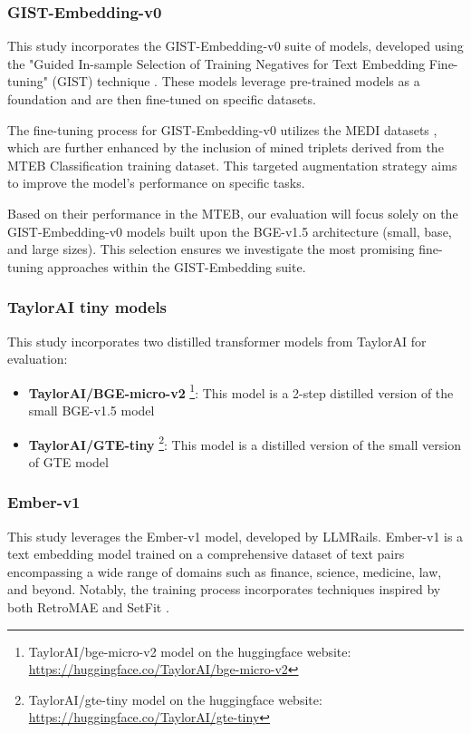 \subsubsection{GIST-Embedding-v0}
This study incorporates the GIST-Embedding-v0 suite of models, developed using the "Guided In-sample Selection of Training Negatives for Text Embedding Fine-tuning" (GIST) technique \cite{solatorio2024gistembed}.
These models leverage pre-trained models as a foundation and are then fine-tuned on specific datasets.

The fine-tuning process for GIST-Embedding-v0 utilizes the MEDI datasets \cite{su2023embedder}, which are further enhanced by the inclusion of mined triplets derived from the \ac{MTEB} Classification training dataset.
This targeted augmentation strategy aims to improve the model's performance on specific tasks.

Based on their performance in the \ac{MTEB}, our evaluation will focus solely on the GIST-Embedding-v0 models built upon the \ac{BGE}-v1.5 architecture (small, base, and large sizes).
This selection ensures we investigate the most promising fine-tuning approaches within the GIST-Embedding suite.

\subsubsection{TaylorAI tiny models} \label{model:taylorai}
This study incorporates two distilled transformer models from TaylorAI for evaluation:

\begin{itemize}
  \item \textbf{TaylorAI/BGE-micro-v2} \footnote{TaylorAI/bge-micro-v2 model on the huggingface website: \url{https://huggingface.co/TaylorAI/bge-micro-v2}}:
    This model is a 2-step distilled version of the small BGE-v1.5 model
  \item \textbf{TaylorAI/GTE-tiny} \footnote{TaylorAI/gte-tiny model on the huggingface website: \url{https://huggingface.co/TaylorAI/gte-tiny}}:
    This model is a distilled version of the small version of GTE model
\end{itemize}

\subsubsection{Ember-v1}
This study leverages the Ember-v1 model, developed by LLMRails.
Ember-v1 is a text embedding model trained on a comprehensive dataset of text pairs encompassing a wide range of domains such as finance, science, medicine, law, and beyond.
Notably, the training process incorporates techniques inspired by both RetroMAE \cite{RetroMAE} and SetFit \cite{tunstall2022efficient}. 


